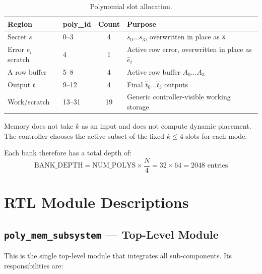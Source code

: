 \documentclass[11pt,letterpaper]{article}
\begin{document}
\begin{table}[H]
\centering
\caption{Polynomial slot allocation.}
\label{tab:poly_map}
\begin{tabular}{@{}llcl@{}}
\toprule
\textbf{Region} & \textbf{poly\_id} & \textbf{Count} & \textbf{Purpose} \\
\midrule
Secret $s$   & 0--3   & 4  & $s_0\ldots s_3$, overwritten in place as $\hat{s}$ \\
Error $e_i$ scratch & 4 & 1 & Active row error, overwritten in place as $\hat{e}_i$ \\
A row buffer & 5--8   & 4  & Active row buffer $A_0\ldots A_3$ \\
Output $t$   & 9--12  & 4  & Final $\hat{t}_0\ldots \hat{t}_3$ outputs \\
Work/scratch & 13--31 & 19 & Generic controller-visible working storage \\
\bottomrule
\end{tabular}
\end{table}

Memory does not take $k$ as an input and does not compute dynamic
placement. The controller chooses the active subset of the fixed $k \le 4$
slots for each mode.

Each bank therefore has a total depth of:
\begin{equation}
  \text{BANK\_DEPTH} = \text{NUM\_POLYS} \times \frac{N}{4}
                     = 32 \times 64 = 2048 \text{ entries}
\end{equation}

\section{RTL Module Descriptions}
\label{sec:modules}

\subsection{\texttt{poly\_mem\_subsystem} --- Top-Level Module}

This is the single top-level module that integrates all sub-components.
Its responsibilities are:
\end{document}
